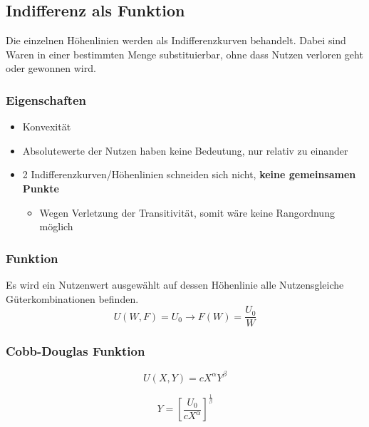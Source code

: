 
\subsection{Indifferenz als Funktion}
Die einzelnen Höhenlinien werden als Indifferenzkurven behandelt. Dabei sind Waren in einer bestimmten Menge substituierbar, ohne dass Nutzen verloren geht oder gewonnen wird.
\subsubsection{Eigenschaften}
\begin{itemize}
    \item Konvexität
    \item Absolutewerte der Nutzen haben keine Bedeutung, nur relativ zu einander
    \item 2 Indifferenzkurven/Höhenlinien schneiden sich nicht, \textbf{keine gemeinsamen Punkte}
          \begin{itemize}
              \item Wegen Verletzung der Transitivität, somit wäre keine Rangordnung möglich 
          \end{itemize}
\end{itemize}

\subsubsection{Funktion}
Es wird ein Nutzenwert ausgewählt auf dessen Höhenlinie alle Nutzensgleiche Güterkombinationen befinden.
\begin{equation}
    U(W,F) = U_0 \rightarrow F(W) = \frac{U_0}{W}
\end{equation}

\pagebreak
\subsubsection{Cobb-Douglas Funktion}

\begin{definition}
    \begin{equation}
        U(X,Y) = cX^\alpha Y^\beta
    \end{equation}

    \begin{equation}
        Y= \left[\frac{U_0}{cX^\alpha}\right]^\frac{1}{\beta}
    \end{equation}
\end{definition}

